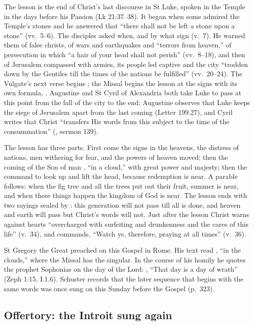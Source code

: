 The lesson is the end of Christ's last discourse in St Luke, spoken in the
Temple in the days before his Passion (Lk 21:37--38). It began when some
admired the Temple's stones and he answered that ``there shall not be left a
stone upon a stone'' (vv.~5--6). The disciples asked when, and by what sign
(v.~7). He warned them of false christs, of wars and earthquakes and ``terrors
from heaven,'' of persecution in which ``a hair of your head shall not
perish'' (vv.~8--18), and then of Jerusalem compassed with armies, its people
led captive and the city ``trodden down by the Gentiles till the times of the
nations be fulfilled'' (vv.~20--24). The Vulgate's next verse begins
; the Missal begins the lesson at the signs with its own
formula, . Augustine and St Cyril of Alexandria both
take Luke to pass at this point from the fall of the city to the end:
Augustine observes that Luke keeps the siege of Jerusalem apart from the last
coming (Letter 199.27), and Cyril writes that Christ ``transfers His words
from this subject to the time of the consummation'' (, sermon 139).

The lesson has three parts. First come the signs in the heavens, the distress
of nations, men withering for fear, and the powers of heaven moved; then the
coming of the Son of man , ``in a cloud,'' with great power and
majesty; then the command to look up and lift the head, because redemption is
near. A parable follows: when the fig tree and all the trees put out their
fruit, summer is near, and when these things happen the kingdom of God is
near. The lesson ends with two sayings sealed by : this
generation will not pass till all is done, and heaven and earth will pass but
Christ's words will not. Just after the lesson Christ warns against hearts
``overcharged with surfeiting and drunkenness and the cares of this life''
(v.~34), and commands, ``Watch ye, therefore, praying at all times''
(v.~36).

St Gregory the Great preached on this Gospel in Rome. His text read
, ``in the clouds,'' where the Missal has the singular. In
the course of his homily he quotes the prophet Sophonias on the day of the
Lord: , ``That day is a day of wrath'' (Zeph
1:15,  I.1.6). Schuster records that the later
sequence that begins with the same words was once sung on this Sunday before
the Gospel (p.~323).

\subsection{Offertory: the Introit sung again}
\label{sec:element-offertory}

